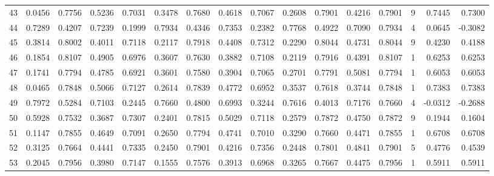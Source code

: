 \begin{tabular}{lrrrrrrrrrrrrrrr}
43  &      0.0456 &  0.7756 &  0.5236 &  0.7031 &  0.3478 &  0.7680 &  0.4618 &  0.7067 &  0.2608 &  0.7901 &   0.4216 &     0.7901 &      9 &                    0.7445 &                     0.7300 \\
44  &      0.7289 &  0.4207 &  0.7239 &  0.1999 &  0.7934 &  0.4346 &  0.7353 &  0.2382 &  0.7768 &  0.4922 &   0.7090 &     0.7934 &      4 &                    0.0645 &                    -0.3082 \\
45  &      0.3814 &  0.8002 &  0.4011 &  0.7118 &  0.2117 &  0.7918 &  0.4408 &  0.7312 &  0.2290 &  0.8044 &   0.4731 &     0.8044 &      9 &                    0.4230 &                     0.4188 \\
46  &      0.1854 &  0.8107 &  0.4905 &  0.6976 &  0.3607 &  0.7630 &  0.3882 &  0.7108 &  0.2119 &  0.7916 &   0.4391 &     0.8107 &      1 &                    0.6253 &                     0.6253 \\
47  &      0.1741 &  0.7794 &  0.4785 &  0.6921 &  0.3601 &  0.7580 &  0.3904 &  0.7065 &  0.2701 &  0.7791 &   0.5081 &     0.7794 &      1 &                    0.6053 &                     0.6053 \\
48  &      0.0465 &  0.7848 &  0.5066 &  0.7127 &  0.2614 &  0.7839 &  0.4772 &  0.6952 &  0.3537 &  0.7618 &   0.3744 &     0.7848 &      1 &                    0.7383 &                     0.7383 \\
49  &      0.7972 &  0.5284 &  0.7103 &  0.2445 &  0.7660 &  0.4800 &  0.6993 &  0.3244 &  0.7616 &  0.4013 &   0.7176 &     0.7660 &      4 &                   -0.0312 &                    -0.2688 \\
50  &      0.5928 &  0.7532 &  0.3687 &  0.7307 &  0.2401 &  0.7815 &  0.5029 &  0.7118 &  0.2579 &  0.7872 &   0.4750 &     0.7872 &      9 &                    0.1944 &                     0.1604 \\
51  &      0.1147 &  0.7855 &  0.4649 &  0.7091 &  0.2650 &  0.7794 &  0.4741 &  0.7010 &  0.3290 &  0.7660 &   0.4471 &     0.7855 &      1 &                    0.6708 &                     0.6708 \\
52  &      0.3125 &  0.7664 &  0.4441 &  0.7335 &  0.2450 &  0.7901 &  0.4216 &  0.7356 &  0.2448 &  0.7801 &   0.4841 &     0.7901 &      5 &                    0.4776 &                     0.4539 \\
53  &      0.2045 &  0.7956 &  0.3980 &  0.7147 &  0.1555 &  0.7576 &  0.3913 &  0.6968 &  0.3265 &  0.7667 &   0.4475 &     0.7956 &      1 &                    0.5911 &                     0.5911 \\

\end{tabular}
